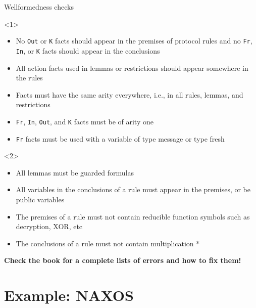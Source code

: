 \documentclass[11pt,aspectratio=169]{beamer}
\begin{document}
\begin{frame}[fragile]{Wellformedness checks}
    \begin{onlyenv}<1>
        \begin{itemize}
            \item No \texttt{Out} or \texttt{K} facts should appear in the 
                  premises of protocol rules and no \texttt{Fr}, \texttt{In}, 
                  or \texttt{K} facts should appear in the conclusions
            \item All action facts used in lemmas or restrictions should appear 
                  somewhere in the rules
            \item Facts must have the same arity everywhere, i.e., in all 
                  rules, lemmas, and restrictions
            \item \texttt{Fr}, \texttt{In}, \texttt{Out}, and \texttt{K} facts
                  must be of arity one
            \item \texttt{Fr} facts must be used with a variable of type 
                  message or type fresh
        \end{itemize}
    \end{onlyenv}
    \begin{onlyenv}<2>
        \begin{itemize}
            \item All lemmas must be guarded formulas
            \item All variables in the conclusions of a rule must appear in the 
                  premises, or be public variables
            \item The premises of a rule must not contain reducible function 
                  symbols such as decryption, XOR, etc
            \item The conclusions of a rule must not contain multiplication *
        \end{itemize}
        \begin{center}
            \textbf{Check the book for a complete lists of errors and how to 
                    fix them!}
        \end{center}
    \end{onlyenv}
\end{frame}


\section*{Example: NAXOS}
\end{document}
